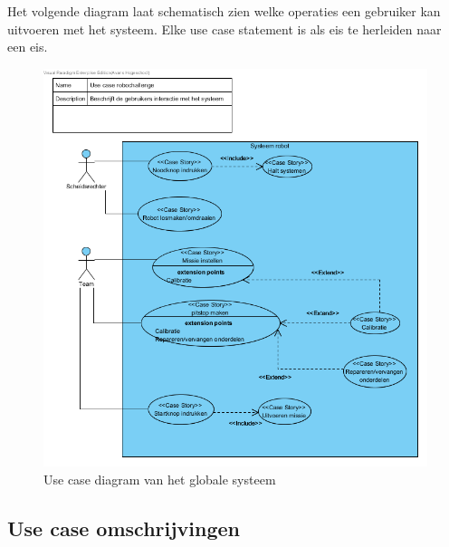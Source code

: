 \documentclass[12pt]{article} %
\begin{document}
Het volgende diagram laat schematisch zien welke operaties een gebruiker kan uitvoeren met het systeem. Elke use case statement is als eis te herleiden naar een eis.
\begin{center}
\begin{figure}
\includegraphics[scale=.9]{usecase.png}
\caption{Use case diagram van het globale systeem}
\label{fig:usecase}
\end{figure}
\end{center}
\clearpage

\subsection{Use case omschrijvingen}
\end{document}
